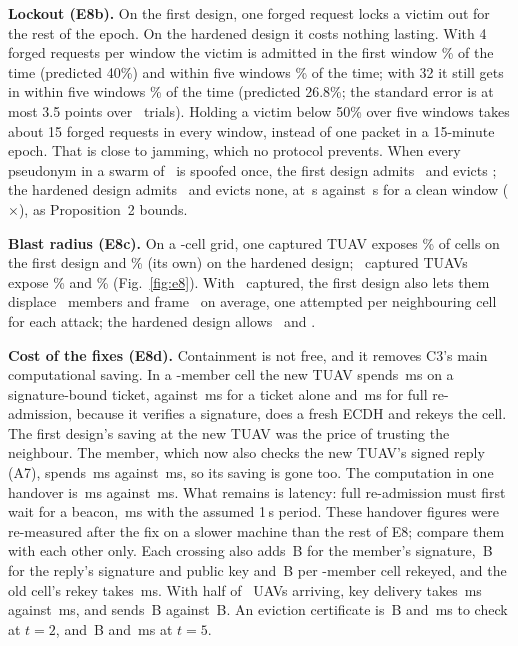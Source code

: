 \documentclass[conference]{IEEEtran}
\begin{document}
\textbf{Lockout (E8b).} On the first design, one forged request locks a victim out for the rest of the epoch. On the hardened design it costs nothing lasting. With 4 forged requests per
window the victim is admitted in the first window \ELockFourFirst\% of the time (predicted 40\%) and within five windows \ELockFourFive\% of the time; with 32 it still gets in within
five windows \ELockThirtyTwoFive\% of the time (predicted 26.8\%; the standard error is at most 3.5 points over \ELockTrials\ trials). Holding a victim below 50\% over five windows takes about 15 forged requests in every window, instead of one packet in a
15-minute epoch. That is close to jamming, which no protocol prevents. When every pseudonym in a swarm of \ESwarmN\ is spoofed once, the first design admits \ESwarmFirst\ and evicts
\ESwarmEvictedFirst; the hardened design admits \ESwarmHard\ and evicts none, at \ESwarmSpoofS\,s against \ESwarmCleanS\,s for a clean window (\ESwarmCostRatio$\times$), as Proposition~2 bounds.

\textbf{Blast radius (E8c).} On a \EBlastCells-cell grid, one captured TUAV exposes \EBlastFirstOne\% of cells on the first design and \EBlastHardOne\% (its own) on the hardened design; \EBlastCapMax\
captured TUAVs expose \EBlastFirstMax\% and \EBlastHardMax\% (Fig.~\ref{fig:e8}). With \EBlastCapMax\ captured, the first design also lets them displace \EBlastDispFirst\ members and frame \EBlastFrameFirst\ on
average, one attempted per neighbouring cell for each attack; the hardened design allows \EBlastDispHard\ and \EBlastFrameHard.

\textbf{Cost of the fixes (E8d).} Containment is not free, and it removes C3's main computational saving. In a \EHoCell-member cell the new TUAV spends \EHoTuavHard\,ms on a signature-bound
ticket, against \EHoTuavFirst\,ms for a ticket alone and \EHoTuavFull\,ms for full re-admission, because it verifies a signature, does a fresh ECDH and rekeys the cell. The
first design's saving at the new TUAV was the price of trusting the neighbour. The member, which now also checks the new TUAV's signed reply (A7), spends \EHoMemHard\,ms against
\EHoMemFull\,ms, so its saving is gone too. The computation in one handover is \EHoGapHard\,ms against \EHoGapFull\,ms. What remains is latency: full re-admission must first wait
for a beacon, \EHoGapFullWait\,ms with the assumed 1\,s period. These handover figures were re-measured after the fix on a slower machine than the rest of E8; compare them
with each other only. Each crossing also adds \EHoSigBytes\,B for the member's signature, \EHoReplySigBytes\,B for the reply's signature and public key and \EHoRekeyBytes\,B per \EHoCell-member cell rekeyed, and the old cell's rekey takes \EHoDepart\,ms. With half of
\EJoinN\ UAVs arriving, key delivery takes \EJoinHardMs\,ms against \EJoinFirstMs\,ms, and sends \EJoinHardB\,B against \EJoinFirstB\,B. An eviction certificate is \ECertTwoB\,B and \ECertTwoMs\,ms to check at $t=2$, and \ECertFiveB\,B and
\ECertFiveMs\,ms at $t=5$.
\end{document}
